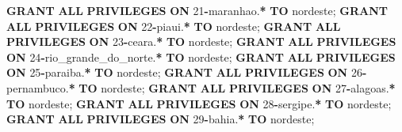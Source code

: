 \documentclass[
]{book}
\newenvironment{Shaded}{\begin{snugshade}}{\end{snugshade}}
\newcommand{\DecValTok}[1]{\textcolor[rgb]{0.00,0.00,0.81}{#1}}
\newcommand{\KeywordTok}[1]{\textcolor[rgb]{0.13,0.29,0.53}{\textbf{#1}}}
\newcommand{\NormalTok}[1]{#1}
\newcommand{\OperatorTok}[1]{\textcolor[rgb]{0.81,0.36,0.00}{\textbf{#1}}}
\newcommand{\StringTok}[1]{\textcolor[rgb]{0.31,0.60,0.02}{#1}}
\begin{document}
\begin{Shaded}
\begin{Highlighting}[]
\KeywordTok{GRANT} \KeywordTok{ALL} \KeywordTok{PRIVILEGES} \KeywordTok{ON}\NormalTok{ \textasciigrave{}}\DecValTok{21}\OperatorTok{{-}}\NormalTok{maranhao\textasciigrave{}.}\OperatorTok{*}            \KeywordTok{TO} \StringTok{\textquotesingle{}nordeste\textquotesingle{}}\NormalTok{;}
\KeywordTok{GRANT} \KeywordTok{ALL} \KeywordTok{PRIVILEGES} \KeywordTok{ON}\NormalTok{ \textasciigrave{}}\DecValTok{22}\OperatorTok{{-}}\NormalTok{piaui\textasciigrave{}.}\OperatorTok{*}               \KeywordTok{TO} \StringTok{\textquotesingle{}nordeste\textquotesingle{}}\NormalTok{;}
\KeywordTok{GRANT} \KeywordTok{ALL} \KeywordTok{PRIVILEGES} \KeywordTok{ON}\NormalTok{ \textasciigrave{}}\DecValTok{23}\OperatorTok{{-}}\NormalTok{ceara\textasciigrave{}.}\OperatorTok{*}               \KeywordTok{TO} \StringTok{\textquotesingle{}nordeste\textquotesingle{}}\NormalTok{;}
\KeywordTok{GRANT} \KeywordTok{ALL} \KeywordTok{PRIVILEGES} \KeywordTok{ON}\NormalTok{ \textasciigrave{}}\DecValTok{24}\OperatorTok{{-}}\NormalTok{rio\_grande\_do\_norte\textasciigrave{}.}\OperatorTok{*} \KeywordTok{TO} \StringTok{\textquotesingle{}nordeste\textquotesingle{}}\NormalTok{;}
\KeywordTok{GRANT} \KeywordTok{ALL} \KeywordTok{PRIVILEGES} \KeywordTok{ON}\NormalTok{ \textasciigrave{}}\DecValTok{25}\OperatorTok{{-}}\NormalTok{paraiba\textasciigrave{}.}\OperatorTok{*}             \KeywordTok{TO} \StringTok{\textquotesingle{}nordeste\textquotesingle{}}\NormalTok{;}
\KeywordTok{GRANT} \KeywordTok{ALL} \KeywordTok{PRIVILEGES} \KeywordTok{ON}\NormalTok{ \textasciigrave{}}\DecValTok{26}\OperatorTok{{-}}\NormalTok{pernambuco\textasciigrave{}.}\OperatorTok{*}          \KeywordTok{TO} \StringTok{\textquotesingle{}nordeste\textquotesingle{}}\NormalTok{;}
\KeywordTok{GRANT} \KeywordTok{ALL} \KeywordTok{PRIVILEGES} \KeywordTok{ON}\NormalTok{ \textasciigrave{}}\DecValTok{27}\OperatorTok{{-}}\NormalTok{alagoas\textasciigrave{}.}\OperatorTok{*}             \KeywordTok{TO} \StringTok{\textquotesingle{}nordeste\textquotesingle{}}\NormalTok{;}
\KeywordTok{GRANT} \KeywordTok{ALL} \KeywordTok{PRIVILEGES} \KeywordTok{ON}\NormalTok{ \textasciigrave{}}\DecValTok{28}\OperatorTok{{-}}\NormalTok{sergipe\textasciigrave{}.}\OperatorTok{*}             \KeywordTok{TO} \StringTok{\textquotesingle{}nordeste\textquotesingle{}}\NormalTok{;}
\KeywordTok{GRANT} \KeywordTok{ALL} \KeywordTok{PRIVILEGES} \KeywordTok{ON}\NormalTok{ \textasciigrave{}}\DecValTok{29}\OperatorTok{{-}}\NormalTok{bahia\textasciigrave{}.}\OperatorTok{*}               \KeywordTok{TO} \StringTok{\textquotesingle{}nordeste\textquotesingle{}}\NormalTok{;}


\end{Highlighting}
\end{Shaded}
\end{document}
